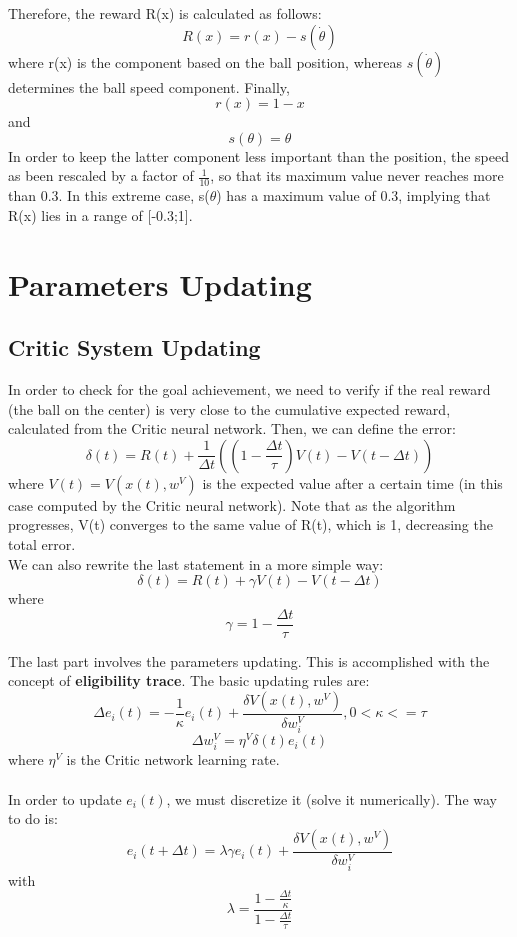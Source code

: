 \documentclass{article}
\begin{document}
Therefore, the reward R(x) is calculated as follows:
\[
R(x) = r(x) - s(\dot{\theta})
\]
where r(x) is the component based on the ball position, whereas \(s(\dot{\theta})\) determines the ball speed component. Finally,
\[
r(x) = 1 - x
\]
and
\[
s(\theta) = \theta
\]
In order to keep the latter component less important than the position, the speed as been rescaled by a factor of \(\frac{1}{10}\), so that its maximum value never reaches more than 0.3. In this extreme case, s(\(\theta\)) has a maximum value of 0.3, implying that R(x) lies in a range of [-0.3;1].


\section{Parameters Updating}

\subsection{Critic System Updating}
In order to check for the goal achievement, we need to verify if the real reward (the ball on the center) is very close to the cumulative expected reward, calculated from the Critic neural network. Then, we can define the error:
\[
\delta(t) = R(t) + \frac{1}{\Delta t}((1 - \frac{\Delta t}{\tau})V(t) - V(t - \Delta t))
\]
where \(V(t)=V(x(t), w^{V})\) is the expected value after a certain time (in this case computed by the Critic neural network). Note that as the algorithm progresses, V(t) converges to the same value of R(t), which is 1, decreasing the total error.\\
We can also rewrite the last statement in a more simple way:
\[
\delta(t) = R(t) + \gamma V(t) - V(t - \Delta t)
\]
where
\[
\gamma = 1 - \frac{\Delta t}{\tau}
\]

The last part involves the parameters updating. This is accomplished with the concept of \textbf{eligibility trace}. The basic updating rules are:
\[
\Delta e_{i}(t) = -\frac{1}{\kappa}e_{i}(t) + \frac{\delta V(x(t), w^{V})}{\delta w_{i}^{V}}, 0 < \kappa <= \tau
\]
\[
\Delta w_{i}^{V} = \eta^{V} \delta (t)e_{i}(t)
\]
where \(\eta^{V}\) is the Critic network learning rate. \\ \\

In order to update \(e_{i}(t)\), we must discretize it (solve it numerically). The way to do is:
\[
e_{i}(t + \Delta t) = \lambda \gamma e_{i}(t) + \frac{\delta V(x(t), w^{V})}{\delta w_{i}^{V}}
\]
with
\[
\lambda = \frac{1 - \frac{\Delta t}{\kappa}}{1 - \frac{\Delta t}{\tau}}
\]
\end{document}
